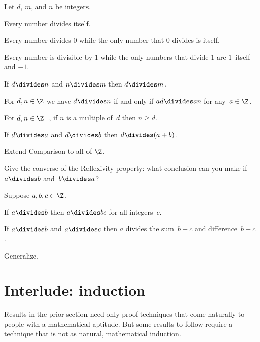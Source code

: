 \documentclass{ibl}
\begin{document}
\begin{ex}
Let $d$, $m$, and $n$ be integers.
\pord
\begin{exes}
\item {} Every number divides itself.
\item Every number divides $0$ while
  the only number that $0$ divides is itself.
\item Every number is divisible by $1$ while
  the only numbers that divide $1$ are $1$~itself and $-1$.
\item {} If $d\divides n$ and $n\divides m$ 
   then $d\divides m$.
\item {} 
  For $d,n\in\Z$ we have $d\divides n$ if and only if 
  $ad\divides an$ for any~$a\in\Z$.
\item {} 
  For $d,n\in\Z^+$, if $n$ is a multiple of~$d$ then $n\geq d$.
\item If $d\divides a$ and $d\divides b$ then $d\divides (a+b)$.  
\end{exes}
\end{ex}

\begin{ex}
Extend Comparison to all of $\Z$.  
\end{ex}

\begin{ex}
Give the converse of the Reflexivity property: what conclusion can you make
if $a\divides b$ and~$b\divides a$?
\end{ex}

\begin{ex}
Suppose $a,b,c\in\Z$.
\begin{exes}
\item If $a\divides b$ then $a\divides bc$ for all integers~$c$.
\item If $a\divides b$ and $a\divides c$ then $a$ divides the 
  sum~$b+c$ and difference~$b-c$.
\item Generalize.
\end{exes}
\end{ex}




\section{Interlude: induction}
Results in the prior section need only proof techniques that come naturally
to people with a mathematical aptitude.
But some results to follow require a technique 
that is not as natural, mathematical induction.
\end{document}
